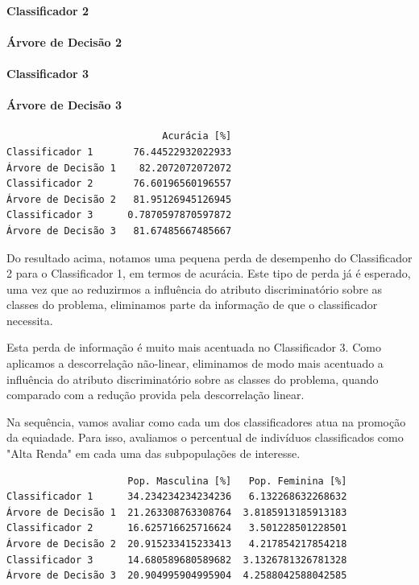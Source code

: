 \documentclass[11pt]{article}
\begin{document}
    \paragraph{Classificador 2}\label{classificador-2}

    \paragraph{Árvore de Decisão 2}\label{uxe1rvore-de-decisuxe3o-2}

    \paragraph{Classificador 3}\label{classificador-3}

    \paragraph{Árvore de Decisão 3}\label{uxe1rvore-de-decisuxe3o-3}

    
    \begin{verbatim}
                           Acurácia [%]
Classificador 1       76.44522932022933
Árvore de Decisão 1    82.2072072072072
Classificador 2       76.60196560196557
Árvore de Decisão 2   81.95126945126945
Classificador 3      0.7870597870597872
Árvore de Decisão 3   81.67485667485667
    \end{verbatim}

    
    Do resultado acima, notamos uma pequena perda de desempenho do
Classificador 2 para o Classificador 1, em termos de acurácia. Este tipo
de perda já é esperado, uma vez que ao reduzirmos a influência do
atributo discriminatório sobre as classes do problema, eliminamos parte
da informação de que o classificador necessita.

Esta perda de informação é muito mais acentuada no Classificador 3. Como
aplicamos a descorrelação não-linear, eliminamos de modo mais acentuado
a influência do atributo discriminatório sobre as classes do problema,
quando comparado com a redução provida pela descorrelação linear.

Na sequência, vamos avaliar como cada um dos classificadores atua na
promoção da equiadade. Para isso, avaliamos o percentual de indivíduos
classificados como "Alta Renda" em cada uma das subpopulações de
interesse.

    
    \begin{verbatim}
                     Pop. Masculina [%]   Pop. Feminina [%]
Classificador 1      34.234234234234236   6.132268632268632
Árvore de Decisão 1  21.263308763308764  3.8185913185913183
Classificador 2      16.625716625716624   3.501228501228501
Árvore de Decisão 2  20.915233415233413   4.217854217854218
Classificador 3      14.680589680589682  3.1326781326781328
Árvore de Decisão 3  20.904995904995904  4.2588042588042585
    \end{verbatim}
\end{document}
